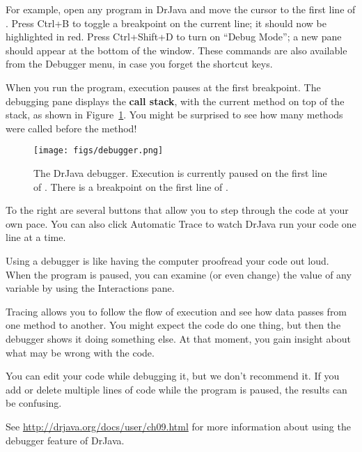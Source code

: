 For example, open any program in DrJava and move the cursor to the first line of .
Press {\sf Ctrl+B} to toggle a breakpoint on the current line; it should now be highlighted in red.
Press {\sf Ctrl+Shift+D} to turn on ``Debug Mode''; a new pane should appear at the bottom of the window.
These commands are also available from the {\sf Debugger} menu, in case you forget the shortcut keys.


When you run the program, execution pauses at the first breakpoint.
The debugging pane displays the {\bf call stack}, with the current method on top of the stack, as shown in Figure~\ref{fig.debugger}.
You might be surprised to see how many methods were called before the  method!

\begin{figure}[!ht]
\begin{center}
\texttt{[image: figs/debugger.png]}
\caption{The DrJava debugger.
Execution is currently paused on the first line of .
There is a breakpoint on the first line of .}
\label{fig.debugger}
\end{center}
\end{figure}



To the right are several buttons that allow you to step through the code at your own pace.
You can also click {\sf Automatic Trace} to watch DrJava run your code one line at a time.

Using a debugger is like having the computer proofread your code out loud.
When the program is paused, you can examine (or even change) the value of any variable by using the Interactions pane.

Tracing allows you to follow the flow of execution and see how data passes from one method to another.
You might expect the code do one thing, but then the debugger shows it doing something else.
At that moment, you gain insight about what may be wrong with the code.

You can edit your code while debugging it, but we don't recommend it.
If you add or delete multiple lines of code while the program is paused, the results can be confusing.

See \url{http://drjava.org/docs/user/ch09.html} for more information about using the debugger feature of DrJava.


